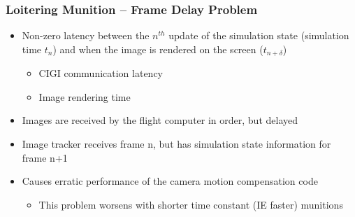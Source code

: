 \documentclass[aspectratio=169]{beamer}
\begin{document}
\begin{frame}
  \frametitle{Loitering Munition -- Frame Delay Problem}
  \begin{itemize}
  \item Non-zero latency between the $n^{th}$ update of the simulation state
    (simulation time $t_{n}$) and when the image is rendered on the
    screen ($t_{n+\delta}$)
    \begin{itemize}
    \item CIGI communication latency
    \item Image rendering time
    \end{itemize}
  \item Images are received by the flight computer in order, but delayed
  \item Image tracker receives frame n, but has simulation state information for frame n+1
  \item Causes erratic performance of the camera motion compensation
    code
    \begin{itemize}
    \item This problem worsens with shorter time constant (IE faster)
      munitions
    \end{itemize}
  \end{itemize}
\end{frame}
\end{document}
